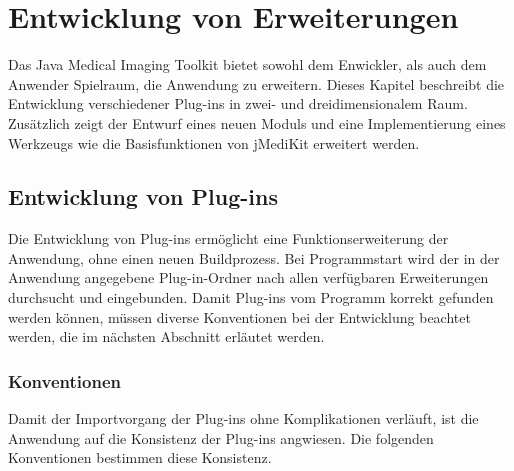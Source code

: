 \chapter{Entwicklung von Erweiterungen} \label{extending}

Das Java Medical Imaging Toolkit bietet sowohl dem Enwickler, als auch dem Anwender Spielraum, die Anwendung zu erweitern. Dieses Kapitel beschreibt die Entwicklung verschiedener Plug-ins in zwei- und dreidimensionalem Raum. Zusätzlich zeigt der Entwurf eines neuen Moduls und eine Implementierung eines Werkzeugs wie die Basisfunktionen von jMediKit erweitert werden.

\section{Entwicklung von Plug-ins}

Die Entwicklung von Plug-ins ermöglicht eine Funktionserweiterung der Anwendung, ohne einen neuen Buildprozess. Bei Programmstart wird der in der Anwendung angegebene Plug-in-Ordner nach allen verfügbaren Erweiterungen durchsucht und eingebunden. Damit Plug-ins vom Programm korrekt gefunden werden können, müssen diverse Konventionen bei der Entwicklung beachtet werden, die im nächsten Abschnitt erläutet werden.

\subsection{Konventionen}
Damit der Importvorgang der Plug-ins ohne Komplikationen verläuft, ist die Anwendung auf die Konsistenz der Plug-ins angwiesen. Die folgenden Konventionen bestimmen diese Konsistenz.


